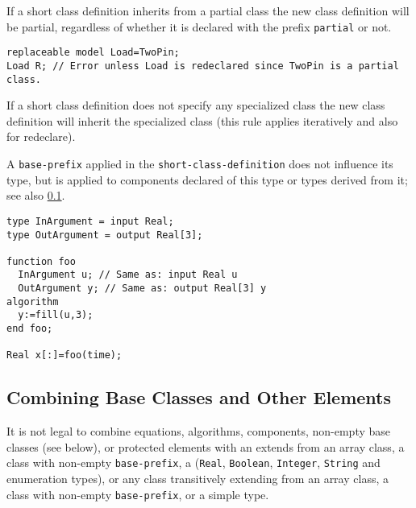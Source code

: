 If a short class definition inherits from a partial class the new class definition will be partial, regardless of whether it is declared with the prefix \lstinline!partial! or not.

\begin{example}
\begin{lstlisting}[language=modelica]
replaceable model Load=TwoPin;
Load R; // Error unless Load is redeclared since TwoPin is a partial class.
\end{lstlisting}
\end{example}

If a short class definition does not specify any specialized class the new class definition will inherit the specialized class (this rule applies iteratively and also for redeclare).

A \lstinline[language=grammar]!base-prefix! applied in the \lstinline[language=grammar]!short-class-definition! does not influence its type, but is applied to components declared of this type or types derived from it; see also \cref{restriction-on-combining-base-classes-and-other-elements}.

\begin{example}
\begin{lstlisting}[language=modelica]
type InArgument = input Real;
type OutArgument = output Real[3];

function foo
  InArgument u; // Same as: input Real u
  OutArgument y; // Same as: output Real[3] y
algorithm
  y:=fill(u,3);
end foo;

Real x[:]=foo(time);
\end{lstlisting}
\end{example}

\subsection{Combining Base Classes and Other Elements}\label{restriction-on-combining-base-classes-and-other-elements}\label{combining-base-classes-and-other-elements}

It is not legal to combine equations, algorithms, components, non-empty base classes (see below), or protected elements with an extends from an array class, a class with non-empty \lstinline[language=grammar]!base-prefix!, a  (\lstinline!Real!, \lstinline!Boolean!, \lstinline!Integer!, \lstinline!String! and enumeration types), or any class transitively extending from an array class, a class with non-empty \lstinline[language=grammar]!base-prefix!, or a simple type.

